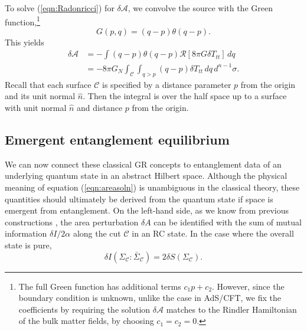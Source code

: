 \documentclass[%
12pt,preprint,
nofootinbib,
amsmath,amssymb,
aps,
prd,
showpacs,
superscriptaddress
]{revtex4-2}
\newcommand{\R}{\mathscr{R}}
\newcommand{\region}{\Sigma}
\newcommand{\area}{\mathcal{A}}
\DeclareMathOperator{\co}{:}
\begin{document}
To solve (\ref{eqn:Radonricci}) for $\delta \area$, we convolve the source with the Green function,\footnote{The full Green function has additional terms $c_1p+c_2$. However, since the boundary condition is unknown, unlike the case in AdS/CFT, we fix the coefficients by requiring the solution $\delta \area$ matches to the Rindler Hamiltonian of the bulk matter fields, by choosing $c_1=c_2=0$. }
\begin{equation}
G(p,q) = (q-p)\theta(q-p).
\end{equation}
This yields
\begin{align}
\delta \area &=- \int  (q-p)\theta(q-p) \R[8\pi G \delta T_{tt}] \, dq\\
&=-8\pi G_N\int_{\mathcal{C}}\int_{q>p} (q-p)\delta T_{tt}\, dq\, d^{n-1}\sigma.
\label{eqn:areasoln}
\end{align}
Recall that each surface  $\mathcal{C}$ is specified by a distance parameter $p$ from the origin and its unit normal $\hat{n}$. Then the integral is over the half space up to a surface with unit normal $\hat{n}$ and distance $p$ from the origin. 

\subsection{Emergent entanglement equilibrium}

We can now connect these classical GR concepts to entanglement data of an underlying quantum state in an abstract Hilbert space.
Although the physical meaning of equation (\ref{eqn:areasoln}) is unambiguous in the classical theory, these quantities should ultimately be derived from the quantum state if space is emergent from entanglement. On the left-hand side, as we know from previous constructions \cite{Cao:2016mst}, the area perturbation $\delta A$ can be identified with the sum of mutual information $\delta I/2\alpha$ along the cut $\mathcal{C}$ in an RC state. In the case where the overall state is pure, 
\begin{equation}
\delta I({\region}_{\mathcal{C}}\co \bar{{\region}}_{\mathcal{C}}) = 2\delta S({\region}_{\mathcal{C}}).
\end{equation}
\end{document}
